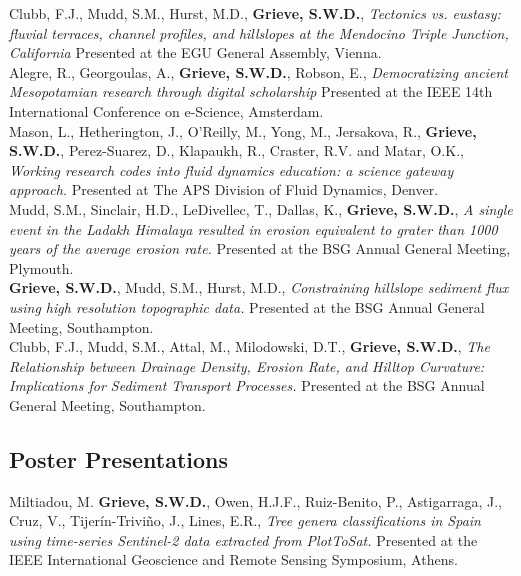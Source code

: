 \documentclass[10pt, a4paper]{article}
\newcommand{\years}[1]{\marginnote{\scriptsize #1}}
\begin{document}
\years{2018}Clubb, F.J., Mudd, S.M., Hurst, M.D., \textbf{Grieve, S.W.D.}, \textit{Tectonics vs. eustasy: fluvial terraces, channel profiles, and hillslopes at the Mendocino Triple Junction, California} Presented at the EGU General Assembly, Vienna.\\[0.05cm]

\years{2018}Alegre, R., Georgoulas, A., \textbf{Grieve, S.W.D.}, Robson, E., \textit{Democratizing ancient Mesopotamian research through digital scholarship} Presented at the IEEE 14th International Conference on e-Science, Amsterdam.\\[0.05cm]

\years{2017}Mason, L., Hetherington, J., O'Reilly, M., Yong, M., Jersakova, R., \textbf{Grieve, S.W.D.}, Perez-Suarez, D., Klapaukh, R., Craster, R.V. and Matar, O.K., \textit{Working research codes into fluid dynamics education: a science gateway approach.} Presented at The APS Division of Fluid Dynamics, Denver.\\[0.05cm]

\years{2016}Mudd, S.M., Sinclair, H.D., LeDivellec, T., Dallas, K., \textbf{Grieve, S.W.D.}, \textit{A single event in the Ladakh Himalaya resulted in erosion equivalent to grater than 1000 years of the average erosion rate.} Presented at the BSG Annual General Meeting, Plymouth.\\[0.05cm]

\years{2015}\textbf{Grieve, S.W.D.}, Mudd, S.M., Hurst, M.D., \textit{Constraining hillslope sediment flux using high resolution topographic data.} Presented at the BSG Annual General Meeting, Southampton.\\[0.05cm]

\years{2015}Clubb, F.J., Mudd, S.M., Attal, M., Milodowski, D.T., \textbf{Grieve, S.W.D.}, \textit{The Relationship between Drainage Density, Erosion Rate, and Hilltop Curvature: Implications for Sediment Transport Processes.} Presented at the BSG Annual General Meeting, Southampton.

\subsection*{Poster Presentations}

\years{2024} Miltiadou, M. \textbf{Grieve, S.W.D.}, Owen, H.J.F., Ruiz-Benito, P., Astigarraga, J., Cruz, V., Tijerín-Triviño, J., Lines, E.R., \textit{Tree genera classifications in Spain using time-series Sentinel-2 data extracted from PlotToSat.} Presented at the IEEE International Geoscience and Remote Sensing Symposium, Athens.\\[0.05cm]
\end{document}
